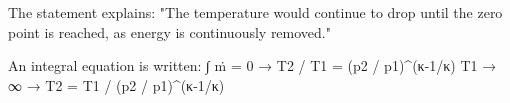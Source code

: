 The statement explains:  
"The temperature would continue to drop until the zero point is reached, as energy is continuously removed."  

An integral equation is written:  
∫ ṁ = 0 → T2 / T1 = (p2 / p1)^(κ-1/κ)  
T1 → ∞ → T2 = T1 / (p2 / p1)^(κ-1/κ)
